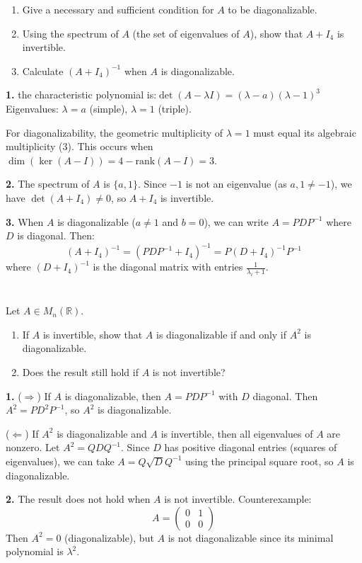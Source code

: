 \documentclass[12pt]{article}
\begin{document}
\begin{enumerate}
    \item Give a necessary and sufficient condition for $A$ to be diagonalizable.
    \item Using the spectrum of $A$ (the set of eigenvalues of $A$), show that $A+I_{4}$ is invertible.
    \item Calculate $(A+I_{4})^{-1}$ when $A$ is diagonalizable.
\end{enumerate}

\begin{correctionbox}
\textbf{1.} the characteristic polynomial is:$\det(A-\lambda I) = (\lambda-a)(\lambda-1)^3$ \\ 
Eigenvalues: $\lambda = a$ (simple), $\lambda = 1$ (triple).

For diagonalizability, the geometric multiplicity of $\lambda=1$ must equal its algebraic multiplicity (3). This occurs when $\dim(\ker(A-I)) = 4 - \text{rank}(A-I) = 3$.

\textbf{2.} The spectrum of $A$ is $\{a, 1\}$. Since $-1$ is not an eigenvalue (as $a, 1 \ne -1$), we have $\det(A+I_4) \ne 0$, so $A+I_4$ is invertible.

\textbf{3.} When $A$ is diagonalizable ($a \ne 1$ and $b = 0$), we can write $A = PDP^{-1}$ where $D$ is diagonal. Then:
$$(A+I_4)^{-1} = (PDP^{-1} + I_4)^{-1} = P(D+I_4)^{-1}P^{-1}$$
where $(D+I_4)^{-1}$ is the diagonal matrix with entries $\frac{1}{\lambda_i+1}$.
\end{correctionbox}

\section{}
Let $A \in M_{n}(\mathbb{R})$.
\begin{enumerate}
    \item If $A$ is invertible, show that $A$ is diagonalizable if and only if $A^2$ is diagonalizable.
    \item Does the result still hold if $A$ is not invertible?
\end{enumerate}

\begin{correctionbox}
\textbf{1.} ($\Rightarrow$) If $A$ is diagonalizable, then $A = PDP^{-1}$ with $D$ diagonal. Then $A^2 = PD^2P^{-1}$, so $A^2$ is diagonalizable.

($\Leftarrow$) If $A^2$ is diagonalizable and $A$ is invertible, then all eigenvalues of $A$ are nonzero. Let $A^2 = QDQ^{-1}$. Since $D$ has positive diagonal entries (squares of eigenvalues), we can take $A = Q\sqrt{D}Q^{-1}$ using the principal square root, so $A$ is diagonalizable.

\textbf{2.} The result does not hold when $A$ is not invertible. Counterexample:
$$A = \begin{pmatrix}0 & 1 \\ 0 & 0\end{pmatrix}$$
Then $A^2 = 0$ (diagonalizable), but $A$ is not diagonalizable since its minimal polynomial is $\lambda^2$.
\end{correctionbox}
\end{document}
